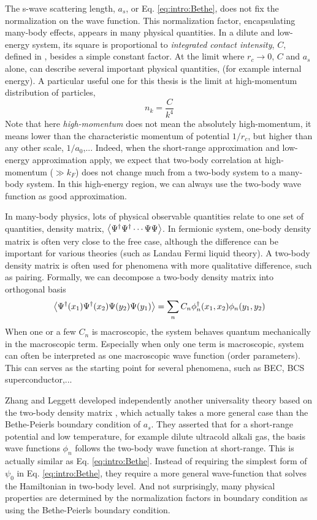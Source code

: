  The s-wave scattering length, $a_s$, or Eq. \ref{eq:intro:Bethe}, does not fix the normalization on the wave function. This normalization factor, encapsulating many-body effects, appears in many physical quantities.  In a dilute and low-energy system,  its square is proportional to  \emph{integrated contact intensity}, $C$, defined in \cite{ Tan2008-1,Tan2008-2,CombescotTan}, besides a simple constant factor.  At the limit where $r_c\to0$, $C$ and $a_s$ alone, can describe several important physical quantities, (for example internal energy).  A particular useful one for this thesis is the limit at high-momentum distribution of particles, 
 \begin{equation}
 n_k=\frac{C}{k^4}
 \end{equation}
 Note that here \emph{high-momentum} does not mean the absolutely high-momentum, it means lower than the characteristic momentum of potential $1/r_c$, but higher than any other scale, $1/a_0$,...  
 Indeed, when the short-range approximation and low-energy approximation apply, we expect that two-body correlation at  high-momentum ($\gg{k_{F}}$) does not change much from a two-body system to a many-body system.  In this high-energy region, we can always use   the two-body wave function as good approximation. 
 
 In many-body physics, lots of physical observable quantities relate to one set of  quantities, density matrix, $\bigl<{\Psi^{\dagger}\Psi^{\dagger}\cdots\Psi\Psi}\bigr>$. In fermionic system,  one-body density matrix is often very close to the free case, although the difference can be important for various theories (such as Landau Fermi liquid theory).  A two-body density matrix is often  used for phenomena with  more qualitative difference, such as pairing. Formally, we can decompose a two-body density matrix into orthogonal basis
 \begin{equation}
 \bigl<{\Psi^{\dagger}(x_1)\Psi^{\dagger}(x_2)\Psi(y_2)\Psi(y_1)}\bigr>=\sum_nC_n\phi_n^{\dagger}(x_1,x_2)\phi_n(y_1,y_2)
 \end{equation}     
 When one or a few $C_n$ is macroscopic, the system behaves quantum mechanically in the macroscopic term.  Especially when only one term is macroscopic, system can often be interpreted as one macroscopic wave function (order parameters).\cite{Leggett}  This can serves as the starting point for several phenomena, such as BEC, BCS superconductor,...
 
Zhang and Leggett developed independently another universality theory based on the two-body density matrix \linebreak[2] \cite{shizhongUniv}, which actually takes a more general case than the Bethe-Peierls boundary condition of $a_{s}$.   They asserted that for a short-range potential and low temperature, for example dilute ultracold alkali gas, the basis wave functions $\phi_n$ follows the two-body wave function at short-range. This is actually similar as Eq. \ref{eq:intro:Bethe}.  Instead of requiring the simplest form of $\psi_0$ in Eq. \eqref{eq:intro:Bethe}, they require a more general wave-function that solves the  Hamiltonian in two-body level.  And not surprisingly, many physical properties are determined by the normalization factors in boundary condition as using the Bethe-Peierls boundary condition.  

